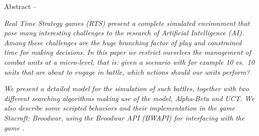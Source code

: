 \begin{bfseries} Abstract -- \end{bfseries}
\emph{
Real Time Strategy games (RTS) present a complete simulated environment that pose many interesting challenges to the research of Artificial Intelligence (AI).
Among these challenges are the huge branching factor of play and constrained time for making decisions.
In this paper we restrict ourselves the management of combat units at a micro-level, that is: given a scenario with for example 10 vs.\ 10 units that are about to engage in battle, which actions should our units perform?
}

\emph{
We present a detailed model for the simulation of such battles, together with two different searching algorithms making use of the model, Alpha-Beta and UCT.
We also describe some scripted behaviors and their implementation in the game Stacraft: Broodwar, using the Broodwar API (BWAPI) for interfacing with the game \cite{BWAPI}.
}
